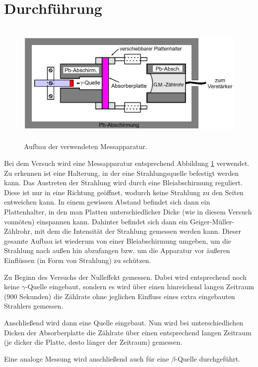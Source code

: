 \section{Durchführung}
\label{sec:Durchführung}
\begin{figure}[H]
  \centering
  \includegraphics[height=6cm]{Aufbau.PNG}
  \caption{Aufbau der verwendeten Messapparatur. \cite{sample}}
  \label{fig:aufbau}
\end{figure}

Bei dem Versuch wird eine Messapparatur entsprechend Abbildung \ref{fig:aufbau} verwendet.
Zu erkennen ist eine Halterung, in der eine Strahlungsquelle befestigt werden kann.
Das Austreten der Strahlung wird durch eine Bleiabschirmung reguliert. Diese ist nur
in eine Richtung geöffnet, wodurch keine Strahlung zu den Seiten entweichen kann.
In einem gewissen Abstand befindet sich dann ein Plattenhalter, in den man Platten unterschiedlicher
Dicke (wie in diesem Versuch vonnöten) einspannen kann.
Dahinter befindet sich dann ein Geiger-Müller-Zählrohr, mit dem die Intensität der Strahlung gemessen werden kann. Dieser gesamte Aufbau
ist wiederum von einer Bleiabschirmung umgeben, um die Strahlung nach außen hin abzufangen bzw.
um die Apparatur vor äußeren Einflüssen (in Form von Strahlung) zu schützen.

Zu Beginn des
Versuchs der Nulleffekt gemessen. Dabei wird entsprechend noch keine $\gamma$-Quelle eingebaut,
sondern es wird über einen hinreichend langen Zeitraum (900 Sekunden) die Zählrate ohne
jeglichen Einfluss eines extra eingebauten Strahlers gemessen.

Anschließend wird dann eine Quelle eingebaut. Nun wird bei unterschiedlichen Dicken
der Absorberplatte die Zählrate über einen entsprechend langen Zeitraum (je dicker die
Platte, desto länger der Zeitraum) gemessen.

Eine analoge Messung wird anschließend auch für eine $\beta$-Quelle durchgeführt.
